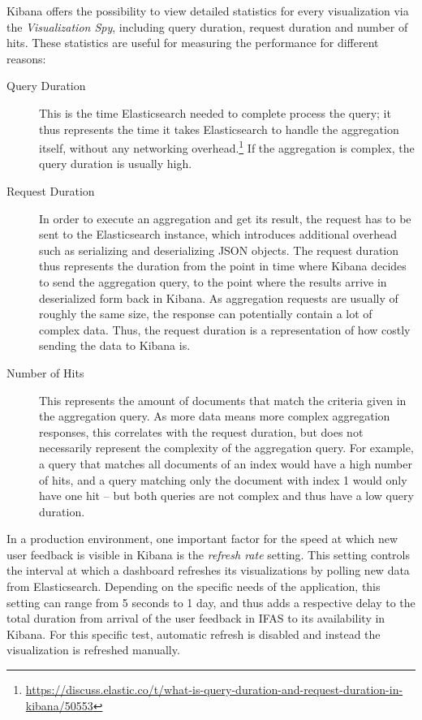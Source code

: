 Kibana offers the possibility to view detailed statistics for every visualization via the \emph{Visualization Spy}, including query duration, request duration and number of hits.
These statistics are useful for measuring the performance for different reasons:

\begin{description}
\item[Query Duration] This is the time Elasticsearch needed to complete process the query; it thus represents the time it takes Elasticsearch to handle the aggregation itself, without any networking overhead.\footnote{\url{https://discuss.elastic.co/t/what-is-query-duration-and-request-duration-in-kibana/50553}}
If the aggregation is complex, the query duration is usually high.
\item[Request Duration] In order to execute an aggregation and get its result, the request has to be sent to the Elasticsearch instance, which introduces additional overhead such as serializing and deserializing \ac{JSON} objects.
The request duration thus represents the duration from the point in time where Kibana decides to send the aggregation query, to the point where the results arrive in deserialized form back in Kibana.
As aggregation requests are usually of roughly the same size, the response can potentially contain a lot of complex data.
Thus, the request duration is a representation of how costly sending the data to Kibana is.
\item[Number of Hits] This represents the amount of documents that match the criteria given in the aggregation query.
As more data means more complex aggregation responses, this correlates with the request duration, but does not necessarily represent the complexity of the aggregation query.
For example, a query that matches all documents of an index would have a high number of hits, and a query matching only the document with index 1 would only have one hit -- but both queries are not complex and thus have a low query duration.
\end{description}

In a production environment, one important factor for the speed at which new user feedback is visible in Kibana is the \emph{refresh rate} setting.
This setting controls the interval at which a dashboard refreshes its visualizations by polling new data from Elasticsearch.
Depending on the specific needs of the application, this setting can range from 5 seconds to 1 day, and thus adds a respective delay to the total duration from arrival of the user feedback in \ac{IFAS} to its availability in Kibana.
For this specific test, automatic refresh is disabled and instead the visualization is refreshed manually.


